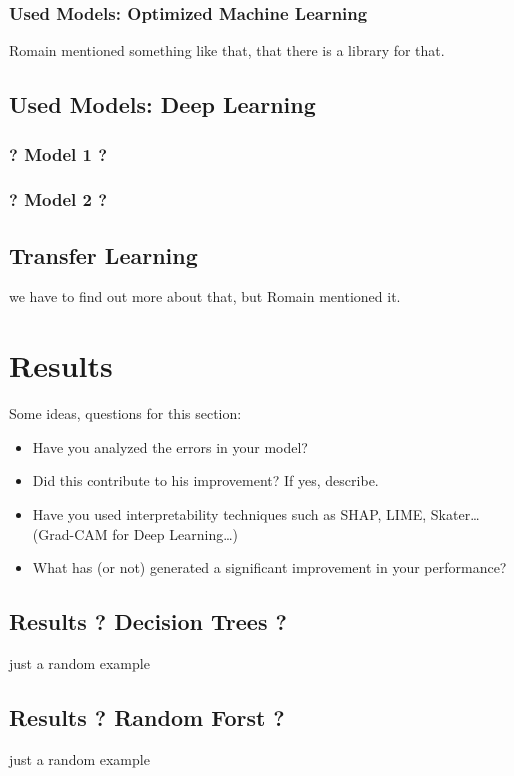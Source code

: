 \documentclass{article}
\begin{document}
\subsubsection{Used Models: Optimized Machine Learning}
Romain mentioned something like that, that there is a library for that.

\subsection{Used Models: Deep Learning}

\subsubsection{? Model 1 ?}
\subsubsection{? Model 2 ?}

\subsection{Transfer Learning}
we have to find out more about that, but Romain mentioned it.

\section{Results}
Some ideas, questions for this section:

\begin{itemize}
    \item Have you analyzed the errors in your model?
    \item Did this contribute to his improvement? If yes, describe.
    \item Have you used interpretability techniques such as SHAP, LIME, Skater… (Grad-CAM for Deep Learning…)
    \item What has (or not) generated a significant improvement in your performance?
\end{itemize}



\subsection{Results ? Decision Trees ?}
just a random example

\subsection{Results ? Random Forst ?}
just a random example
\end{document}
